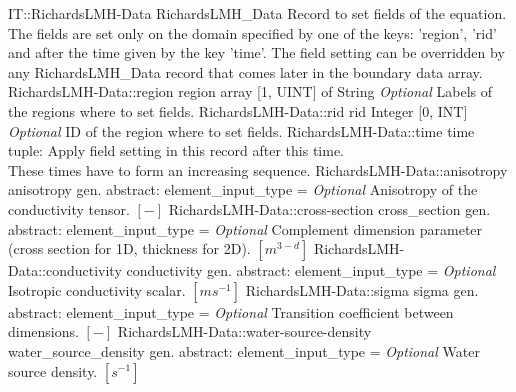 \begin{RecordType}
	{IT::RichardsLMH-Data}
	{RichardsLMH{\_}Data}
	{}%
	{}%
	{{{Record to set fields of the equation.}\\{
The fields are set only on the domain specified by one of the keys: 'region', 'rid'}\\{
and after the time given by the key 'time'. The field setting can be overridden by}\\{
 any RichardsLMH{\_}Data record that comes later in the boundary data array.}%
}}
		\RecKey
			{RichardsLMH-Data::region}
			{region}
			{{array [1, UINT] of }{String}}{}
			{ \it{Optional}}
			{{{Labels of the regions where to set fields. }%
}}
		\RecKey
			{RichardsLMH-Data::rid}
			{rid}
			{{Integer [0, INT]}}{}
			{ \it{Optional}}
			{{{ID of the region where to set fields.}%
}}
		\RecKey
			{RichardsLMH-Data::time}
			{time}
			{{tuple: }}{}
			{ }
			{{{Apply field setting in this record after this time.}\\{
These times have to form an increasing sequence.}%
}}
		\RecKey
			{RichardsLMH-Data::anisotropy}
			{anisotropy}
			{{gen. abstract: }}{{element{\_}input{\_}type}{ = }}
			{ \it{Optional}}
			{{{Anisotropy of the conductivity tensor. }{$[-]$}%
}}
		\RecKey
			{RichardsLMH-Data::cross-section}
			{cross{\_}section}
			{{gen. abstract: }}{{element{\_}input{\_}type}{ = }}
			{ \it{Optional}}
			{{{Complement dimension parameter (cross section for 1D, thickness for 2D). }{$[m^{3-d}]$}%
}}
		\RecKey
			{RichardsLMH-Data::conductivity}
			{conductivity}
			{{gen. abstract: }}{{element{\_}input{\_}type}{ = }}
			{ \it{Optional}}
			{{{Isotropic conductivity scalar. }{$[ms^{-1}]$}%
}}
		\RecKey
			{RichardsLMH-Data::sigma}
			{sigma}
			{{gen. abstract: }}{{element{\_}input{\_}type}{ = }}
			{ \it{Optional}}
			{{{Transition coefficient between dimensions. }{$[-]$}%
}}
		\RecKey
			{RichardsLMH-Data::water-source-density}
			{water{\_}source{\_}density}
			{{gen. abstract: }}{{element{\_}input{\_}type}{ = }}
			{ \it{Optional}}
			{{{Water source density. }{$[s^{-1}]$}%
}}
\end{RecordType}
